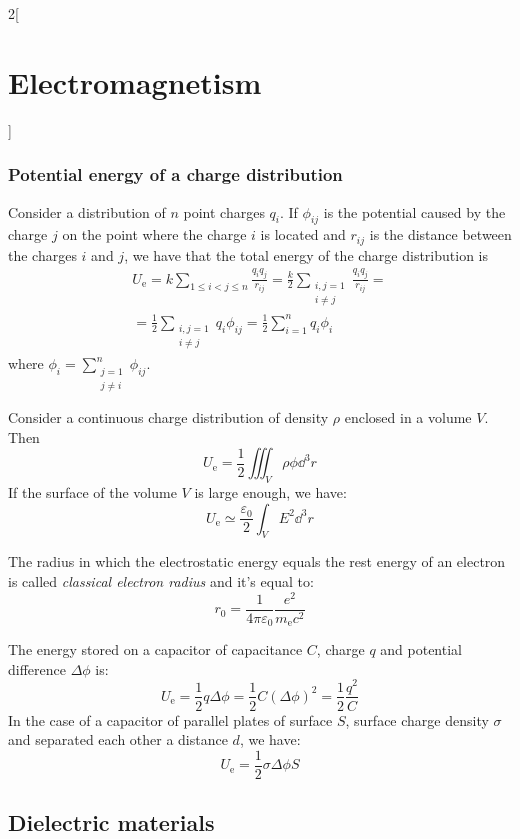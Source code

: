 \documentclass[../../../main_physics.tex]{subfiles}
\begin{document}
\begin{multicols}{2}[\section{Electromagnetism}]
  \subsubsection{Potential energy of a charge distribution}
  \begin{proposition}
    Consider a distribution of $n$ point charges $q_i$. If $\phi_{ij}$ is the potential caused by the charge $j$ on the point where the charge $i$ is located and $r_{ij}$ is the distance between the charges $i$ and $j$, we have that the total energy of the charge distribution is
    \begin{multline*}
      U_\text{e}=k\sum_{1\leq i<j\leq n}\frac{q_iq_j}{r_{ij}}=\frac{k}{2}\sum_{\substack{i,j=1\\i\ne j}}\frac{q_iq_j}{r_{ij}}=\\
      =\frac{1}{2}\sum_{\substack{i,j=1\\i\ne j}}q_i\phi_{ij}=\frac{1}{2}\sum_{i=1}^nq_i\phi_i
    \end{multline*}
    where $\displaystyle\phi_i=\sum_{\substack{j=1\\j\ne i}}^n\phi_{ij}$.
  \end{proposition}
  \begin{proposition}
    Consider a continuous charge distribution of density $\rho$ enclosed in a volume $V$. Then $$U_\text{e}=\frac{1}{2}\iiint_V\rho\phi \dd^3r$$
    If the surface of the volume $V$ is large enough, we have: $$U_\text{e}\simeq\frac{\varepsilon_0}{2}\int_VE^2\dd^3r$$
  \end{proposition}
  \begin{definition}
    The radius in which the electrostatic energy equals the rest energy of an electron is called \emph{classical electron radius} and it's equal to: $$r_0=\frac{1}{4\pi\varepsilon_0}\frac{e^2}{m_\text{e}c^2}$$
  \end{definition}
  \begin{proposition}
    The energy stored on a capacitor of capacitance $C$, charge $q$ and potential difference $\Delta\phi$ is: $$U_\text{e}=\frac{1}{2}q\Delta \phi=\frac{1}{2}C{\left(\Delta\phi\right)}^2=\frac{1}{2}\frac{q^2}{C}$$ In the case of a capacitor of parallel plates of surface $S$, surface charge density $\sigma$ and separated each other a distance $d$, we have: $$U_\text{e}=\frac{1}{2}\sigma\Delta\phi S$$
  \end{proposition}
  \subsection{Dielectric materials}

\end{multicols}
\end{document}
